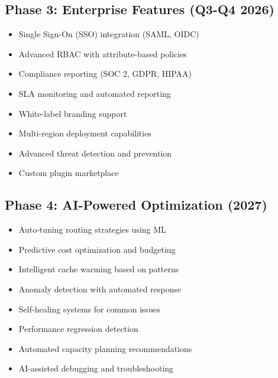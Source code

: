 \documentclass[12pt,a4paper,twoside]{report}
\begin{document}
\subsection{Phase 3: Enterprise Features (Q3-Q4 2026)}

\begin{itemize}[leftmargin=*]
    \item Single Sign-On (SSO) integration (SAML, OIDC)
    \item Advanced RBAC with attribute-based policies
    \item Compliance reporting (SOC 2, GDPR, HIPAA)
    \item SLA monitoring and automated reporting
    \item White-label branding support
    \item Multi-region deployment capabilities
    \item Advanced threat detection and prevention
    \item Custom plugin marketplace
\end{itemize}

\subsection{Phase 4: AI-Powered Optimization (2027)}

\begin{itemize}[leftmargin=*]
    \item Auto-tuning routing strategies using ML
    \item Predictive cost optimization and budgeting
    \item Intelligent cache warming based on patterns
    \item Anomaly detection with automated response
    \item Self-healing systems for common issues
    \item Performance regression detection
    \item Automated capacity planning recommendations
    \item AI-assisted debugging and troubleshooting
\end{itemize}
\end{document}
